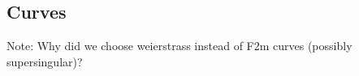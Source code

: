 \subsection{Curves}

Note: Why did we choose weierstrass instead of F2m curves (possibly supersingular)?



